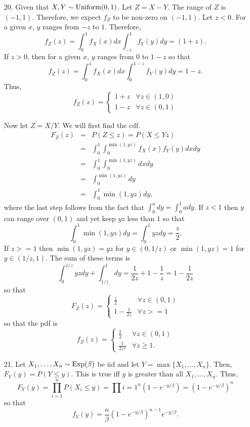 \documentclass{article}
\begin{document}
\begin{enumerate}
\item[20.] Given that $X, Y \sim \text{Uniform}(0, 1)$. Let $Z = X - Y$. The range of $Z$
is $(-1, 1)$. Therefore, we expect $f_Z$ to be non-zero on $(-1, 1)$. Let 
$z < 0$. For a given $x$, $y$ ranges from $-z$ to $1$. Therefore,
\[
f_Z(z) = \int_0^1f_X(x)dx\int_{-z}^1f_Y(y)dy = (1 + z).
\]
If $z > 0$, then for a given $x$, $y$ ranges from $0$ to $1 - z$ so that
\[
f_Z(z) = \int_0^1f_X(x)dx\int_0^{1 - z}f_Y(y)dy = 1 - z.
\]
Thus,
\begin{equation}
f_Z(z) = \begin{cases}
1 + z & \forall z \in (1, 0) \\
1 - z & \forall z \in (0, 1)
\end{cases}
\end{equation}

Now let $Z = X/Y$. We will first find the cdf. 
\begin{eqnarray*}
F_Z(z) &=& P(Z \le z) = P(X \le Yz) \\
 &=& \int_0^1\int_0^{\min(1, yz)}f_X(x)f_Y(y)dxdy \\
 &=& \int_0^1\int_0^{\min(1, yz)}dxdy \\
 &=& \int_0^{\min(1, yz)}dy \\
 &=& \int_0^1 \min(1, yz)dy,
\end{eqnarray*}
where the last step follows from the fact that $\int_0^a dy = \int_0^1 ady$.
If $z < 1$ then $y$ can range over $(0, 1)$ and yet keep $yz$ less than $1$ 
so that
\[
\int_0^1 \min(1, yz)dy = \int_0^1 yz dy = \frac{z}{2}.
\]
If $z >= 1$ then $\min(1, yz) = yz$ for $y \in (0, 1/z)$ or $\min(1, yz) = 1$
for $y \in (1/z, 1)$. The sum of these terms is
\[
\int_0^{1/z}yzdy + \int_{1/z}^1 dy = \frac{1}{2z} + 1 - \frac{1}{z} = 
1 - \frac{1}{2z}
\]
so that
\[
F_Z(z) = \begin{cases}
\frac{z}{2} & \forall z \in (0, 1) \\
1 - \frac{1}{2z} & \forall z >= 1
\end{cases}
\]
so that the pdf is
\[
f_Z(z) = \begin{cases}
\frac{1}{2} & \forall z \in (0, 1) \\
\frac{1}{2z^2} & \forall z \ge 1.
\end{cases}
\]

\item[21.] Let $X_1, \ldots, X_n \sim \text{Exp}(\beta)$ be iid and let $Y = 
\max\{X_1, \ldots, X_n\}$. Then, $F_Y(y) = P(Y \le y)$. This is true iff $y$ is
greater than all $X_1, \ldots, X_n$. Thus,
\[
F_Y(y) = \prod_{i=1}^n P(X_i \le y) = \prod{i=1}^n(1 - e^{-y/\beta}) = 
(1 - e^{-y/\beta})^n
\]
so that
\[
f_Y(y) = \frac{n}{\beta}(1 - e^{-y/\beta})^{n-1}e^{-y/\beta}.
\]
\end{enumerate}
\end{document}
